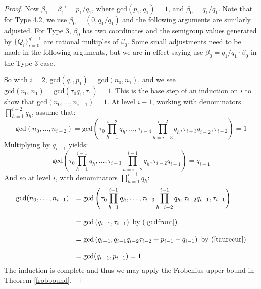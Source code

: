 \documentclass[11pt]{amsart}
\theoremstyle{definition}
\begin{document}
{\begin{proof}
Now $\beta_1=\beta_1'=p_1/q_1$, where $\text{gcd}(p_1,q_1)=1$, and $\beta_0=q_1/q_1$. Note that for Type 4.2, we use $\beta_0=(0,q_1/q_1)$ and the following arguments are similarly adjusted. For Type 3, $\beta_0$ has two coordinates and the semigroup values generated by $\{Q_i\}_{i=0}^{g'-1}$ are rational multiples of $\beta_0$. Some small adjustments need to be made in the following arguments, but we are in effect saying use $\beta_0= q_1/q_1 \cdot \beta_0$ in the Type 3 case.

So with $i=2$, $\text{gcd}(q_1,p_1)=\text{gcd}(n_0,n_1)$, and we see $\text{gcd}(n_0,n_1)=\text{gcd}(\tau_0 q_1,\tau_1)=1$. This is the base step of an induction on $i$ to show that $\text{gcd}(n_0,\ldots,n_{i-1})=1$. At level $i-1$, working with denominators $\prod_{h=1}^{i-2}q_h$, assume that:
\begin{equation*}
\text{gcd}(n_0,\ldots,n_{i-2})=\text{gcd}\left(\tau_0\prod_{h=1}^{i-2}q_h, \ldots ,\tau_{i-4}\prod_{h=i-3}^{i-2}q_h,\tau_{i-3}q_{i-2},\tau_{i-2}\right)=1
\end{equation*}
Multiplying by $q_{i-1}$ yields:
\begin{equation} \label{gcdfront}
\text{gcd}\left(\tau_0\prod_{h=1}^{i-1}q_h, \ldots ,\tau_{i-3}\prod_{h=i-2}^{i-1}q_h,\tau_{i-2} q_{i-1}\right)=q_{i-1}
\end{equation}
And so at level $i$, with denominators $\prod_{h=1}^{i-1} q_h$:
\begin{equation*}
\begin{array}{rl}
\displaystyle \text{gcd}(n_0,\ldots,n_{i-1}) & =\displaystyle \text{gcd}\left(\tau_0 \prod_{h=1}^{i-1}q_h, \ldots ,\tau_{i-3}\prod_{h=i-2}^{i-1}q_h,\tau_{i-2} q_{i-1},\tau_{i-1}\right)
\\\\
& = \text{gcd}\left(q_{i-1},\tau_{i-1}\right) \text{ by (\ref{gcdfront})}
\\\\
& = \text{gcd}\left(q_{i-1},q_{i-1}q_{i-2}\tau_{i-2}+p_{i-1}-q_{i-1}\right) \text{ by (\ref{taurecur})}
\\\\
& = \text{gcd}(q_{i-1},p_{i-1})=1
\end{array}
\end{equation*}
The induction is complete and thus we may apply the Frobenius upper bound in Theorem \ref{frobbound}.


\end{proof}}
\end{document}
